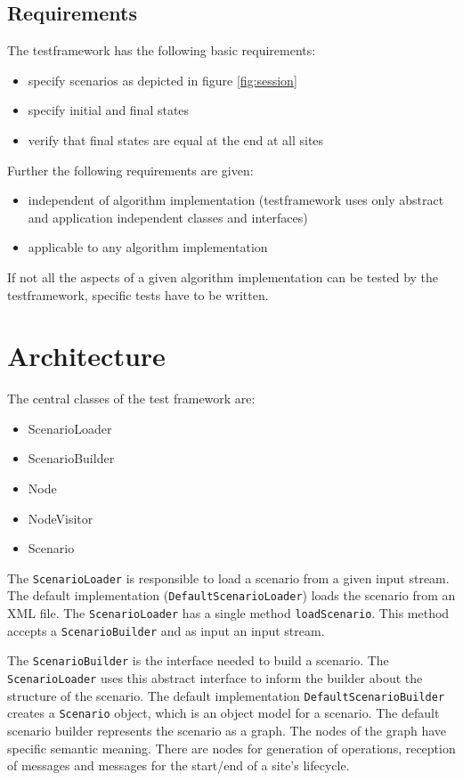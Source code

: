 \documentclass[11pt,a4paper]{article}
\begin{document}
\subsection{Requirements}
The testframework has the following basic requirements:
\begin{itemize}
 \item specify scenarios as depicted in figure \ref{fig:session}
 \item specify initial and final states
 \item verify that final states are equal at the end at all sites
\end{itemize}
Further the following requirements are given:
\begin{itemize}
 \item independent of algorithm implementation (testframework uses only 
       abstract and application independent classes and interfaces)
 \item applicable to any algorithm implementation
\end{itemize}
If not all the aspects of a given algorithm implementation can be tested by the testframework, specific tests have to be written.



\section{Architecture}
The central classes of the test framework are:

\begin{itemize}
 \item ScenarioLoader
 \item ScenarioBuilder
 \item Node
 \item NodeVisitor
 \item Scenario
\end{itemize}

The \texttt{ScenarioLoader} is responsible to load a scenario from a given input stream. The default implementation (\texttt{DefaultScenarioLoader}) loads the scenario from an XML file. The \texttt{ScenarioLoader} has a single method \texttt{loadScenario}. This method accepts a \texttt{ScenarioBuilder} and as input an input stream.

The \texttt{ScenarioBuilder} is the interface needed to build a scenario. The \texttt{ScenarioLoader} uses this abstract interface to inform the builder about the structure of the scenario. The default implementation \texttt{DefaultScenarioBuilder} creates a \texttt{Scenario} object, which is an object model for a scenario. The default scenario builder represents the scenario as a graph. The nodes of the graph have specific semantic meaning. There are nodes for generation of operations, reception of messages and messages for the start/end of a site's lifecycle.
\end{document}
